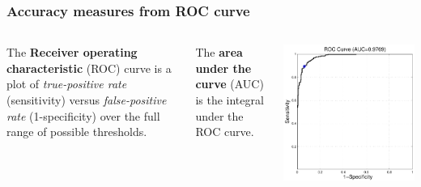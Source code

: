 \begin{frame}
\frametitle{Accuracy measures from ROC curve}
\begin{columns}
The {\bf Receiver operating characteristic} (ROC) curve is a plot of \emph{true-positive rate} (sensitivity) versus \emph{false-positive rate} (1-specificity) over the full range of possible thresholds.\par
\vspace{0.25cm}
The {\bf area under the curve} (AUC) is the integral under the ROC curve.\par
{}
\includegraphics[width=\textwidth]{roc}
\end{columns}
\end{frame}

